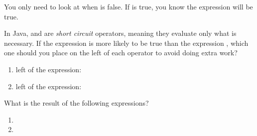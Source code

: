 \begin{answer}
You only need to look at  when  is false.
If  is true, you know the expression will be true.
\end{answer}


\Q In Java, \java{&&} and \java{||} are \emph{short circuit} operators, meaning they evaluate only what is necessary.
If the expression  is more likely to be true than the expression , which one should you place on the left of each operator to avoid doing extra work?

\begin{enumerate}
\item left of the \java{&&} expression:
\item left of the \java{||} expression:
\end{enumerate}


\Q What is the result of the following expressions?
\begin{enumerate}
\item {}
\item {}
\end{enumerate}
